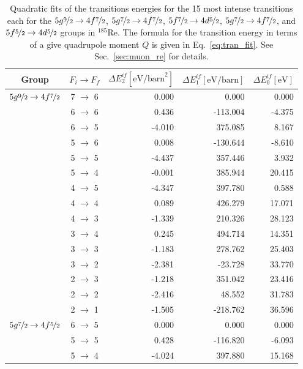 \begin{table}[b]
\caption{\label{tab:re185energ}%
Quadratic fits of the transitions energies for the 15 most intense transitions each for the $5g\nicefrac{9}{2}\rightarrow4f\nicefrac{7}{2}$, $5g\nicefrac{7}{2}\rightarrow4f\nicefrac{7}{2}$, $5f\nicefrac{7}{2}\rightarrow4d\nicefrac{5}{2}$, $5g\nicefrac{7}{2}\rightarrow4f\nicefrac{7}{2}$, and $5f\nicefrac{5}{2}\rightarrow4d\nicefrac{5}{2}$ groups in $^{185}$Re. The formula for the transition energy in terms of a give quadrupole moment $Q$ is given in Eq.~\eqref{eq:tran_fit}. See Sec.~\ref{sec:muon_re} for details.}
\centering
\begin{small}
\begin{tabular}{cc|rrr}
Group& $F_i \rightarrow F_f$ & $\Delta E_2^{if} [\text{eV/barn}^2]$ & $\Delta E_1^{if} [\text{eV/barn}]$ & $\Delta E_0^{if} [\text{eV}]$\\[1pt]\hline%
$5g\nicefrac{9}{2} \rightarrow 4f\nicefrac{7}{2}$ &7 $\rightarrow$ 6&0.000&0.000&0.000\\
&6 $\rightarrow$ 6&0.436&-113.004&-4.375\\
&6 $\rightarrow$ 5&-4.010&375.085&8.167\\
&5 $\rightarrow$ 6&0.008&-130.644&-8.610\\
&5 $\rightarrow$ 5&-4.437&357.446&3.932\\
&5 $\rightarrow$ 4&-0.001&385.944&20.415\\
&4 $\rightarrow$ 5&-4.347&397.780&0.588\\
&4 $\rightarrow$ 4&0.089&426.279&17.071\\
&4 $\rightarrow$ 3&-1.339&210.326&28.123\\
&3 $\rightarrow$ 4&0.245&494.714&14.351\\
&3 $\rightarrow$ 3&-1.183&278.762&25.403\\
&3 $\rightarrow$ 2&-2.381&-23.728&33.770\\
&2 $\rightarrow$ 3&-1.218&351.042&23.416\\
&2 $\rightarrow$ 2&-2.416&48.552&31.783\\
&2 $\rightarrow$ 1&-1.505&-218.762&36.596\\[10pt]
$5g\nicefrac{7}{2} \rightarrow 4f\nicefrac{5}{2}$ &6 $\rightarrow$ 5&0.000&0.000&0.000\\
&5 $\rightarrow$ 5&0.428&-116.820&-6.093\\
&5 $\rightarrow$ 4&-4.024&397.880&15.168\\

\end{tabular}
\end{small}
\end{table}
